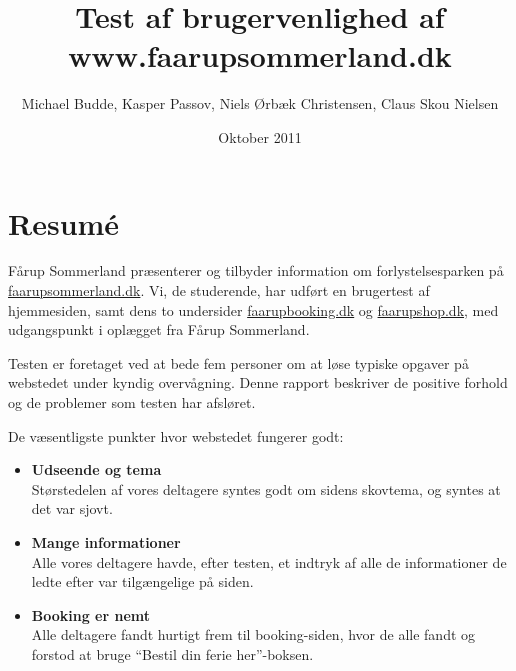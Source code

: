 \documentclass[10pt,a4paper]{article}      %
\author{Michael Budde, Kasper Passov, Niels Ørbæk Christensen, Claus Skou Nielsen}
\title{Test af brugervenlighed af www.faarupsommerland.dk}
\date{Oktober 2011}
\begin{document}
\maketitle
\newpage
\setcounter{page}{1}

\section*{Resumé}
\setcounter{page}{1} %

Fårup Sommerland præsenterer og tilbyder information om forlystelsesparken på
\url{faarupsommerland.dk}. Vi, de studerende, har udført en brugertest af
hjemmesiden, samt dens to undersider \url{faarupbooking.dk} og \url{faarupshop.dk}, med udgangspunkt i oplægget fra Fårup Sommerland.

Testen er foretaget ved at bede fem personer om at løse typiske
opgaver på webstedet under kyndig overvågning. Denne rapport beskriver de
positive forhold og de problemer som testen har afsløret.

\noindent De væsentligste punkter hvor webstedet fungerer godt:
\begin{itemize}
  \item \textbf{Udseende og tema}\\
  Størstedelen af vores deltagere syntes godt om sidens skovtema, og syntes at det var sjovt. 

  \item \textbf{Mange informationer}\\
  Alle vores deltagere havde, efter testen, et indtryk af alle de informationer de ledte efter
  var tilgængelige på siden. 

  \item \textbf{Booking er nemt}\\
  Alle deltagere fandt hurtigt frem til booking-siden, hvor de alle fandt og forstod at bruge ``Bestil din ferie her''-boksen. 

\end{itemize}
\end{document}
